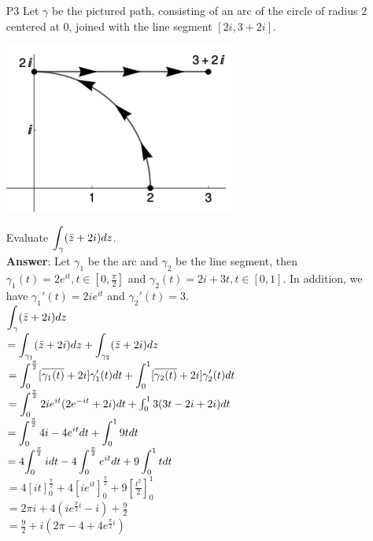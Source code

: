 \documentclass{article}
\begin{document}
\newpage
\begin{itemize}
    \item [P3] Let $\gamma$ be the pictured path, consisting of an arc of the circle of radius $2$ centered at $0$, joined with the line segment $[2i,3+2i]$.
          \begin{center}
              \includegraphics[width=3in]{p3.png}
          \end{center}
          Evaluate $\mathlarger{\int_\gamma(\bar{z}+2i)dz}$.\\
          \textbf{Answer}: Let $\gamma_1$ be the arc and $\gamma_2$ be the line segment, then $\gamma_1(t)=2e^{it}, t\in[0,\frac{\pi}{2}]$ and $\gamma_2(t)=2i+3t, t\in[0,1]$. In addition, we have $\gamma_1'(t)=2ie^{it}$ and $\gamma_2'(t)=3$.\\
          $\mathlarger{\int_\gamma(\bar{z}+2i)dz}$\\
          $=\mathlarger{\int_{\gamma_1}(\bar{z}+2i)dz+\int_{\gamma_2}(\bar{z}+2i)dz}$\\
          $=\mathlarger{\int_{0}^{\frac{\pi}{2}}[\overline{\gamma_1(t)}+2i]\gamma_1'(t)dt+\int_{0}^{1}[\overline{\gamma_2(t)}+2i]\gamma_2'(t)dt}$\\
          $=\mathlarger{\int_{0}^{\frac{\pi}{2}}2ie^{it}(2e^{-it}+2i)dt}+\int_{0}^{1}3(3t-2i+2i)dt$\\
          $=\mathlarger{\int_{0}^{\frac{\pi}{2}}4i-4e^{it}dt+\int_{0}^{1}9tdt}$\\
          $=4\mathlarger{\int_{0}^{\frac{\pi}{2}}idt-4\int_{0}^{\frac{\pi}{2}}e^{it}dt+9\int_{0}^{1}tdt}$\\
          $=4[it]_{0}^{\frac{\pi}{2}}+4[ie^{it}]_{0}^{\frac{\pi}{2}}+9[\frac{t^2}{2}]_0^1$\\
          $=2\pi i+4(ie^{\frac{\pi}{2}i}-i)+\frac{9}{2}$\\
          $=\frac{9}{2}+i(2\pi-4+4e^{\frac{\pi}{2}i})$
\end{itemize}
\end{document}
